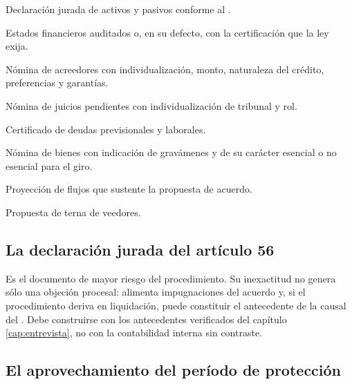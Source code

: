 \bloqueDocumental

\begin{checklist}
  \item Declaración jurada de activos y pasivos conforme al .
  \item Estados financieros auditados o, en su defecto, con la certificación que la ley
  exija.
  \item Nómina de acreedores con individualización, monto, naturaleza del crédito,
  preferencias y garantías.
  \item Nómina de juicios pendientes con individualización de tribunal y rol.
  \item Certificado de deudas previsionales y laborales.
  \item Nómina de bienes con indicación de gravámenes y de su carácter esencial o no
  esencial para el giro.
  \item Proyección de flujos que sustente la propuesta de acuerdo.
  \item Propuesta de terna de veedores.
\end{checklist}

\bloqueFocos

\subsection{La declaración jurada del artículo 56}

Es el documento de mayor riesgo del procedimiento. Su inexactitud no genera sólo una
objeción procesal: alimenta impugnaciones del acuerdo y, si el procedimiento deriva en
liquidación, puede constituir el antecedente de la causal del  .
Debe construirse con los antecedentes verificados del capítulo \ref{cap:entrevista}, no
con la contabilidad interna sin contraste.

\subsection{El aprovechamiento del período de protección}

